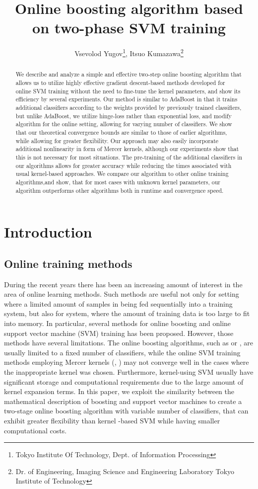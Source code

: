 \documentclass[10pt,twocolumn, a4paper]{article}
\title{Online boosting algorithm based on two-phase SVM training}
\author{Vsevolod Yugov\thanks{Tokyo Institute Of Technology, Dept. of Information Processing}, Itsuo Kumazawa\thanks{Dr. of Engineering,
Imaging Science and Engineering Laboratory 
Tokyo Institute of Technology 
}}
\begin{document}
\maketitle

\begin{abstract}
We describe and analyze a simple and effective two-step online boosting algorithm that allows us to utilize highly effective gradient descent-based methods developed for online SVM training without the need to fine-tune the kernel parameters, and show its efficiency by several experiments. Our method is similar to AdaBoost in that it trains additional classifiers according to the weights provided by previously trained classifiers, but unlike AdaBoost, we utilize hinge-loss rather than exponential loss,  and modify algorithm for the online setting, allowing for varying number of classifiers. We show that our theoretical convergence bounds are similar to those of earlier algorithms, while allowing for greater flexibility. Our approach may also easily incorporate additional nonlinearity in form of Mercer kernels, although our experiments show that this is not necessary for most situations.
The pre-training of the additional classifiers in our algorithms allows for greater accuracy while reducing the times associated with usual kernel-based approaches.
We compare our algorithm to other online training algorithms,and show, that for most cases with unknown kernel parameters, our algorithm outperforms other algorithms both in runtime and convergence speed.
\end{abstract}

\section{Introduction}
\subsection{Online training methods}
During the recent years there has been an increasing amount of interest in the area of online learning methods. Such methods are useful not only for setting where a limited amount of samples in being fed sequentially into a training system, but also for system, where the amount of training data is too large to fit into memory.  In particular, several methods for online boosting and online support vector machine (SVM) training has been proposed. However, those methods have several limitations. The online boosting algorithms, such as \cite{OnlineBoost} or \cite{OZ}, are usually limited to a fixed number of classifiers, while the online SVM training methods employing Mercer kernels (\cite{Norma}, \cite{Pegasos}) may not converge well in the cases where the inappropriate kernel was chosen. Furthermore, kernel-using SVM usually have significant storage and computational requirements due to the large amount of kernel expansion terms. In this paper, we exploit the similarity between the mathematical description of boosting and support vector machines to create a two-stage online boosting algorithm with variable number of classifiers, that can exhibit greater flexibility than kernel -based SVM while having smaller computational costs.
\end{document}
